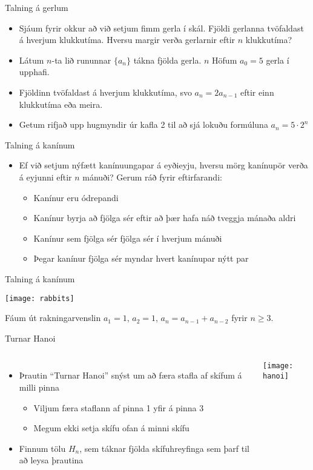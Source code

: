 \documentclass[handout]{beamer}
\begin{document}
\begin{frame}{Talning á gerlum}
\begin{itemize}[<+->]
 \item Sjáum fyrir okkur að við setjum fimm gerla í skál. Fjöldi gerlanna tvöfaldast á hverjum klukkutíma. Hversu margir verða gerlarnir eftir $n$ klukkutíma?
 \item Látum $n$-ta lið rununnar $\{a_n\}$ tákna fjölda gerla. $n$ Höfum $a_0 = 5$ gerla í upphafi.
 \item Fjöldinn tvöfaldast á hverjum klukkutíma, svo $a_n = 2a_{n-1}$ eftir einn klukkutíma eða meira.
 \item Getum rifjað upp hugmyndir úr kafla 2 til að sjá lokuðu formúluna $a_n = 5\cdot 2^n$
\end{itemize}
\end{frame}

\begin{frame}{Talning á kanínum}
 \begin{itemize}
  \item Ef við setjum nýfætt kanínuungapar á eyðieyju, hversu mörg kanínupör verða á eyjunni eftir $n$ mánuði? Gerum ráð fyrir eftirfarandi:
  \begin{itemize}
   \item Kanínur eru ódrepandi
   \item Kanínur byrja að fjölga sér eftir að þær hafa náð tveggja mánaða aldri
   \item Kanínur sem fjölga sér fjölga sér í hverjum mánuði
   \item Þegar kanínur fjölga sér myndar hvert kanínupar nýtt par
  \end{itemize}
 \end{itemize}
\end{frame}

\begin{frame}{Talning á kanínum}

\begin{center}
\texttt{[image: rabbits]}
\end{center}
Fáum út rakningarvenslin $a_1 = 1$, $a_2 = 1$, $a_n = a_{n-1} + a_{n-2}$ fyrir $n \geq 3$.
\end{frame}

\begin{frame}{Turnar Hanoi}
\begin{columns}
\begin{itemize}
 \item Þrautin ``Turnar Hanoi'' snýst um að færa stafla af skífum á milli pinna
 \begin{itemize}
  \item Viljum færa staflann af pinna 1 yfir á pinna 3
  \item Megum ekki setja skífu ofan á minni skífu
 \end{itemize}
 \item Finnum tölu $H_n$, sem táknar fjölda skífuhreyfinga sem þarf til að leysa þrautina
\end{itemize}
\texttt{[image: hanoi]}
\end{columns}
\end{frame}
\end{document}
